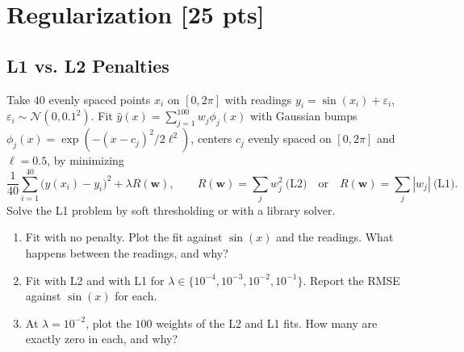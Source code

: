 \documentclass[11pt]{article}
\begin{document}
\section{Regularization [25 pts]}
\subsection{L1 vs. L2 Penalties}
Take $40$ evenly spaced points $x_i$ on $[0, 2\pi]$ with readings $y_i = \sin(x_i) + \varepsilon_i$, $\varepsilon_i \sim \mathcal{N}(0, 0.1^2)$.
Fit $\hat y(x) = \sum_{j=1}^{100} w_j \phi_j(x)$ with Gaussian bumps $\phi_j(x) = \exp\!\left(-(x - c_j)^2 / 2\ell^2\right)$, centers $c_j$ evenly spaced on $[0, 2\pi]$ and $\ell = 0.5$, by minimizing
\[ \frac{1}{40}\sum_{i=1}^{40} \bigl(\hat y(x_i) - y_i\bigr)^2 + \lambda R(\mathbf{w}), \qquad R(\mathbf{w}) = \sum_j w_j^2 \ \text{(L2)} \quad\text{or}\quad R(\mathbf{w}) = \sum_j |w_j| \ \text{(L1)}. \]
Solve the L1 problem by soft thresholding or with a library solver.
\begin{enumerate}
	\item[\textbf{a)}] Fit with no penalty. Plot the fit against $\sin(x)$ and the readings. What happens between the readings, and why?
	\item[\textbf{b)}] Fit with L2 and with L1 for $\lambda \in \{10^{-4}, 10^{-3}, 10^{-2}, 10^{-1}\}$. Report the RMSE against $\sin(x)$ for each.
	\item[\textbf{c)}] At $\lambda = 10^{-2}$, plot the $100$ weights of the L2 and L1 fits. How many are exactly zero in each, and why?
\end{enumerate}
\end{document}
